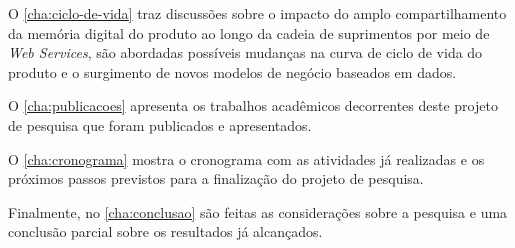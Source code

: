 	O \autoref{cha:ciclo-de-vida} traz discussões sobre o impacto do amplo compartilhamento da memória digital do produto ao longo da cadeia de suprimentos por meio de \textit{Web Services}, são abordadas possíveis mudanças na curva de ciclo de vida do produto e o surgimento de novos modelos de negócio baseados em dados.
	
	
	O \autoref{cha:publicacoes} apresenta os trabalhos acadêmicos decorrentes deste projeto de pesquisa que foram publicados e apresentados.
	
	O \autoref{cha:cronograma} mostra o cronograma com as atividades já realizadas e os próximos passos previstos para a finalização do projeto de pesquisa.
	
	Finalmente, no \autoref{cha:conclusao} são feitas as considerações sobre a pesquisa e uma conclusão parcial sobre os resultados já alcançados.
	
	